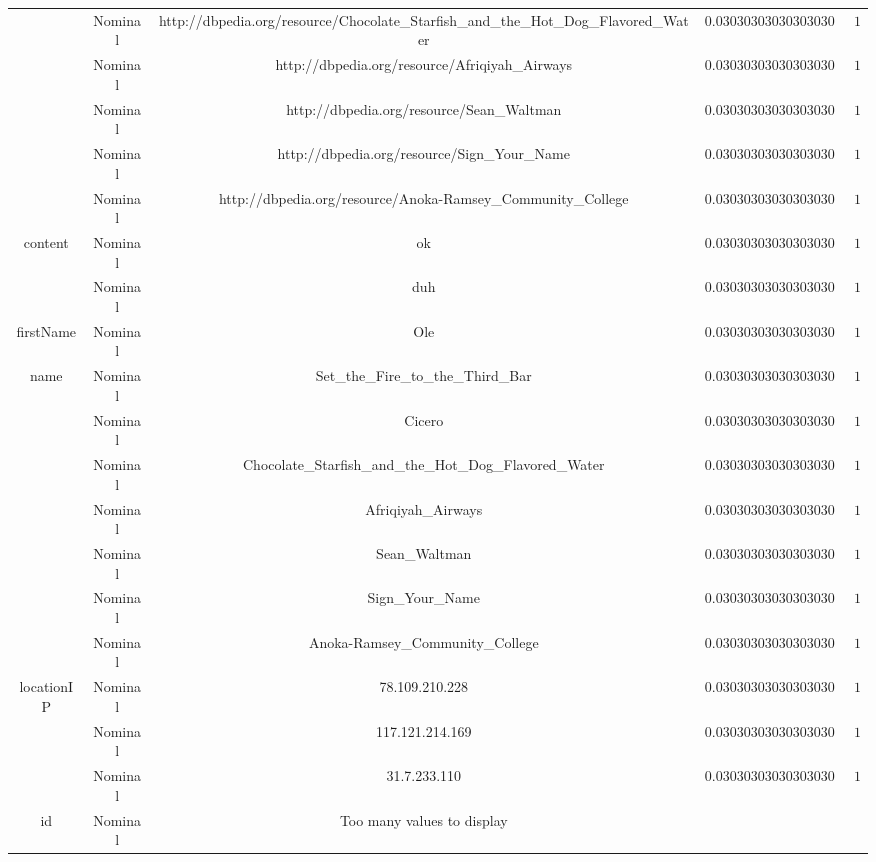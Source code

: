 \begin{tabular}{|c|c|c|c|c|}
 & Nominal & http://dbpedia.org/resource/Chocolate_Starfish_and_the_Hot_Dog_Flavored_Water & $0.030303030303030304$ & $1$ \\ \cline{2-4} 
 & Nominal & http://dbpedia.org/resource/Afriqiyah_Airways & $0.030303030303030304$ & $1$ \\ \cline{2-4} 
 & Nominal & http://dbpedia.org/resource/Sean_Waltman & $0.030303030303030304$ & $1$ \\ \cline{2-4} 
 & Nominal & http://dbpedia.org/resource/Sign_Your_Name & $0.030303030303030304$ & $1$ \\ \cline{2-4} 
 & Nominal & http://dbpedia.org/resource/Anoka-Ramsey_Community_College & $0.030303030303030304$ & $1$ \\ \hline 
\multirow{2}{*}{content} & Nominal & ok & $0.030303030303030304$ & $1$ \\ \cline{2-4} 
 & Nominal & duh & $0.030303030303030304$ & $1$ \\ \hline 
\multirow{1}{*}{firstName} & Nominal & Ole & $0.030303030303030304$ & $1$ \\ \hline 
\multirow{7}{*}{name} & Nominal & Set_the_Fire_to_the_Third_Bar & $0.030303030303030304$ & $1$ \\ \cline{2-4} 
 & Nominal & Cicero & $0.030303030303030304$ & $1$ \\ \cline{2-4} 
 & Nominal & Chocolate_Starfish_and_the_Hot_Dog_Flavored_Water & $0.030303030303030304$ & $1$ \\ \cline{2-4} 
 & Nominal & Afriqiyah_Airways & $0.030303030303030304$ & $1$ \\ \cline{2-4} 
 & Nominal & Sean_Waltman & $0.030303030303030304$ & $1$ \\ \cline{2-4} 
 & Nominal & Sign_Your_Name & $0.030303030303030304$ & $1$ \\ \cline{2-4} 
 & Nominal & Anoka-Ramsey_Community_College & $0.030303030303030304$ & $1$ \\ \hline 
\multirow{3}{*}{locationIP} & Nominal & 78.109.210.228 & $0.030303030303030304$ & $1$ \\ \cline{2-4} 
 & Nominal & 117.121.214.169 & $0.030303030303030304$ & $1$ \\ \cline{2-4} 
 & Nominal & 31.7.233.110 & $0.030303030303030304$ & $1$ \\ \hline 
id & Nominal & Too many values to display & \\ \hline
\end{tabular}


